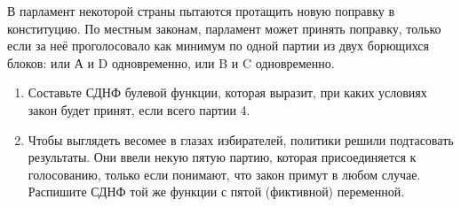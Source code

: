 \question
В парламент некоторой страны пытаются протащить новую поправку в конституцию. По местным законам, парламент может принять поправку, только если за неё проголосовало как минимум по одной партии из двух борющихся блоков: или А и D одновременно, или B и C одновременно.

\begin{enumerate}
    \item Составьте СДНФ булевой функции, которая выразит, при каких условиях закон будет принят, если всего партии 4.
    \item Чтобы выглядеть весомее в глазах избирателей, политики решили подтасовать результаты.  Они ввели некую пятую партию, которая присоединяется к голосованию, только если понимают, что закон примут в любом случае. Распишите СДНФ той же функции с пятой (фиктивной) переменной.
\end{enumerate}